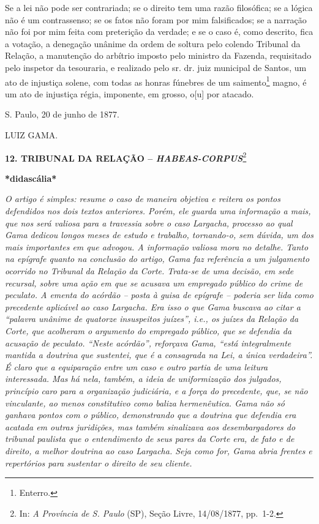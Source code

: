 Se a lei não pode ser contrariada; se o direito tem uma razão
filosófica; se a lógica não é um contrassenso; se os fatos não foram por
mim falsificados; se a narração não foi por mim feita com preterição da
verdade; e se o caso é, como descrito, fica a votação, a denegação
unânime da ordem de soltura pelo colendo Tribunal da Relação, a
manutenção do arbítrio imposto pelo ministro da Fazenda, requisitado
pelo inspetor da tesouraria, e realizado pelo sr. dr. juiz municipal de
Santos, um ato de injustiça solene, com todas as honras fúnebres de um
saimento\footnote{Enterro.} magno, é um ato de injustiça régia,
imponente, em grosso, o{[}u{]} por atacado.

S. Paulo, 20 de junho de 1877.

LUIZ GAMA.

\textbf{12. TRIBUNAL DA RELAÇÃO -- \emph{HABEAS-CORPUS}}\footnote{In:
  \emph{A Província de S. Paulo} (SP), Seção Livre, 14/08/1877, pp.~1-2.}

\textbf{*didascália*}

\emph{O artigo é simples: resume o caso de maneira objetiva e reitera os
pontos defendidos nos dois textos anteriores. Porém, ele guarda uma
informação a mais, que nos será valiosa para a travessia sobre o caso
Largacha, processo ao qual Gama dedicou longos meses de estudo e
trabalho, tornando-o, sem dúvida, um dos mais importantes em que
advogou. A informação valiosa mora no detalhe. Tanto na epígrafe quanto
na conclusão do artigo, Gama faz referência a um julgamento ocorrido no
Tribunal da Relação da Corte. Trata-se de uma decisão, em sede recursal,
sobre uma ação em que se acusava um empregado público do crime de
peculato. A ementa do acórdão -- posta à guisa de epígrafe -- poderia
ser lida como precedente aplicável ao caso Largacha. Era isso o que Gama
buscava ao citar a ``palavra unânime de quatorze insuspeitos juízes'',
i.e., os juízes da Relação da Corte, que acolheram o argumento do
empregado público, que se defendia da acusação de peculato. ``Neste
acórdão'', reforçava Gama, ``está integralmente mantida a doutrina que
sustentei, que é a consagrada na Lei, a única verdadeira''. É claro que
a equiparação entre um caso e outro partia de uma leitura interessada.
Mas há nela, também, a ideia de uniformização dos julgados, princípio
caro para a organização judiciária, e a força do precedente, que, se não
vinculante, ao menos constitutivo como baliza hermenêutica. Gama não só
ganhava pontos com o público, demonstrando que a doutrina que defendia
era acatada em outras juridições, mas também sinalizava aos
desembargadores do tribunal paulista que o entendimento de seus pares da
Corte era, de fato e de direito, a melhor doutrina ao caso Largacha.
Seja como for, Gama abria frentes e repertórios para sustentar o direito
de seu cliente. }

